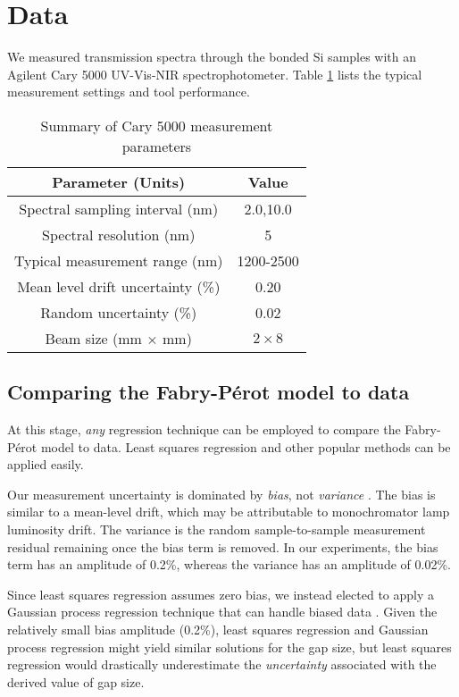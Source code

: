 \documentclass[osajnl,twocolumn,showpacs,superscriptaddress,11pt]{revtex4-1} %
\begin{document}
\section{Data}

We measured transmission spectra through the bonded Si samples with an Agilent Cary 5000 UV-Vis-NIR spectrophotometer.  Table \ref{tabCary5000pars} lists the typical measurement settings and tool performance.

\begin{table}[h!]
\caption{Summary of Cary 5000 measurement parameters \label{tabCary5000pars}}
\begin{center}
\begin{tabular}{ c c }
\hline
        Parameter (Units) & Value \\ 
\hline
        Spectral sampling interval (nm) & 2.0,10.0 \\
        Spectral resolution (nm) & 5 \\
        Typical measurement range (nm) & 1200-2500 \\
		Mean level drift uncertainty (\%) & 0.20 \\
		Random uncertainty (\%) & 0.02 \\
 		Beam size (mm $\times$ mm) & $2 \times 8$ \\
    \hline
    \end{tabular}
\end{center}
\end{table}

\subsection{Comparing the Fabry-P\'{e}rot model to data}

At this stage, \emph{any} regression technique can be employed to compare the Fabry-P\'{e}rot model to data.  Least squares regression and other popular methods can be applied easily.  

Our measurement uncertainty is dominated by \emph{bias}, not \emph{variance} \cite{2013sdmm.book.....I}.  The bias is similar to a mean-level drift, which may be attributable to monochromator lamp luminosity drift.  The variance is the random sample-to-sample measurement residual remaining once the bias term is removed.  In our experiments, the bias term has an amplitude of 0.2\%, whereas the variance has an amplitude of 0.02\%.

Since least squares regression assumes zero bias, we instead elected to apply a Gaussian process regression technique that can handle biased data \cite{2013sdmm.book.....I,DFMgp,rasmussen2006gaussian}.  Given the relatively small bias amplitude (0.2\%), least squares regression and Gaussian process regression might yield similar solutions for the gap size, but least squares regression would drastically underestimate the \emph{uncertainty} associated with the derived value of gap size\cite{DFMgp}.
\end{document}
